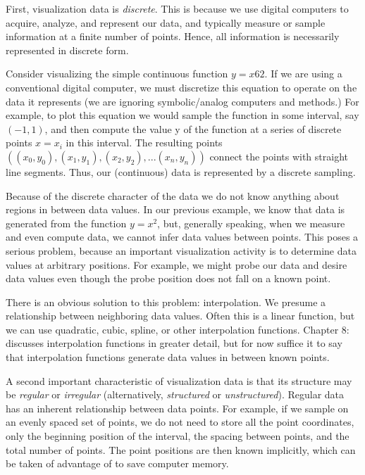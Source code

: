First, visualization data is \emph{discrete}. This is because we use digital computers to acquire, analyze, and represent our data, and typically measure or sample information at a finite number of points. Hence, all information is necessarily represented in discrete form. 

Consider visualizing the simple continuous function $y = x6 2$. If we are using a conventional digital computer, we must discretize this equation to operate on the data it represents (we are ignoring symbolic/analog computers and methods.) For example, to plot this equation we would sample the function in some interval, say $(-1,1)$, and then compute the value y of the function at a series of discrete points $x = x_i$ in this interval. The resulting points $((x_0,y_0), (x_1,y_1), (x_2,y_2), ... (x_n,y_n))$ connect the points with straight line segments. Thus, our (continuous) data is represented by a discrete sampling.

Because of the discrete character of the data we do not know anything about regions in between data values. In our previous example, we know that data is generated from the function $y = x^2$, but, generally speaking, when we measure and even compute data, we cannot infer data values between points. This poses a serious problem, because an important visualization activity is to determine data values at arbitrary positions. For example, we might probe our data and desire data values even though the probe position does not fall on a known point.

There is an obvious solution to this problem: interpolation. We presume a relationship between neighboring data values. Often this is a linear function, but we can use quadratic, cubic, spline, or other interpolation functions. Chapter 8:  discusses interpolation functions in greater detail, but for now suffice it to say that interpolation functions generate data values in between known points.

A second important characteristic of visualization data is that its structure may be \emph{regular} or \emph{irregular} (alternatively, \emph{structured} or \emph{unstructured}). Regular data has an inherent relationship between data points. For example, if we sample on an evenly spaced set of points, we do not need to store all the point coordinates, only the beginning position of the interval, the spacing between points, and the total number of points. The point positions are then known implicitly, which can be taken of advantage of to save computer memory.

